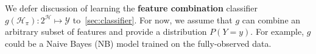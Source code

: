 We defer discussion of learning the \textbf{feature combination} classifier $g(\mathcal{H}_\pi) : 2^\mathcal{H} \mapsto \mathcal{Y}$ to~\autoref{sec:classifier}.
For now, we assume that $g$ can combine an arbitrary subset of features and provide a distribution $P(Y = y)$.
For example, $g$ could be a Naive Bayes (NB) model trained on the fully-observed data.





